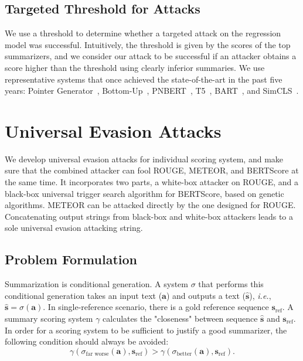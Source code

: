 \documentclass[11pt]{article}
\theoremstyle{remark}
\begin{document}
\subsection{Targeted Threshold for Attacks}
We use a threshold to determine whether a targeted attack on the regression model was successful. Intuitively, the threshold is given by the scores of the top summarizers, and we consider our attack to be successful if an attacker obtains a score higher than the threshold using clearly inferior summaries. We use representative systems that once achieved the state-of-the-art in the past five years: Pointer Generator~\cite{see-etal-2017-get}, Bottom-Up~\cite{gehrmann-etal-2018-bottom}, PNBERT~\cite{zhong-etal-2019-searching}, T5~\cite{raffel2019exploring},
BART~\cite{lewis-etal-2020-bart}, and SimCLS~\cite{liu-liu-2021-simcls}.


\section{Universal Evasion Attacks}\label{sec:methods}
We develop universal evasion attacks for individual scoring system, and make sure that the combined attacker can fool ROUGE, METEOR, and BERTScore at the same time. It incorporates two parts, a white-box attacker on ROUGE, and a black-box universal trigger search algorithm for BERTScore, based on genetic algorithms. METEOR can be attacked directly by the one designed for ROUGE. Concatenating output strings from black-box and white-box attackers leads to a sole universal evasion attacking string.

\subsection{Problem Formulation}

Summarization is conditional generation. A system $\sigma$ that performs this conditional generation takes an input text ($\mathbf{a}$) and outputs a text ($\hat{\mathbf{s}}$), \emph{i.e.}, $\hat{\mathbf{s}} = \sigma(\mathbf{a})$. In single-reference scenario, there is a gold reference sequence $\mathbf{s}_\text{ref}$. A summary scoring system $\gamma$ calculates the "closeness" between sequence $\hat{\mathbf{s}}$ and $\mathbf{s}_\text{ref}$. In order for a scoring system to be sufficient to justify a good summarizer, the following condition should always be avoided:
\begin{equation}\label{eq:cond}
    \gamma(\sigma_\text{far worse}(\mathbf{a}), \mathbf{s}_\text{ref}) > \gamma(\sigma_\text{better}(\mathbf{a}), \mathbf{s}_\text{ref}).
\end{equation}
\end{document}
